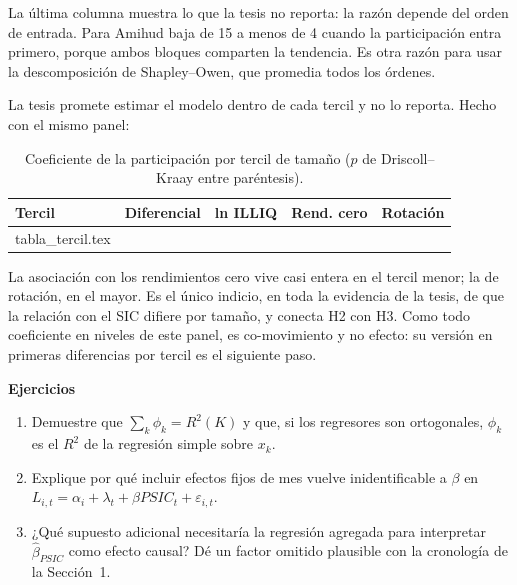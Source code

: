 \documentclass[11pt,letterpaper]{article}
\makeatletter
\newcommand{\tablainput}[1]{\@@input #1.tex }
\theoremstyle{definition}
\theoremstyle{plain}
\newenvironment{ejercicios}{\par\medskip\textbf{Ejercicios}\begin{enumerate}[label=\arabic*.,leftmargin=*]\small}{\end{enumerate}}
\newcommand{\PSIC}{\mathit{PSIC}}
\makeatother
\begin{document}
La última columna muestra lo que la tesis no reporta: la razón depende del orden de entrada. Para Amihud baja de 15 a menos de 4 cuando la participación entra primero, porque ambos bloques comparten la tendencia. Es otra razón para usar la descomposición de Shapley--Owen, que promedia todos los órdenes.

La tesis promete estimar el modelo dentro de cada tercil y no lo reporta. Hecho con el mismo panel:

\begin{table}[h]\centering\small
\caption{Coeficiente de la participación por tercil de tamaño ($p$ de Driscoll--Kraay entre paréntesis).}
\begin{tabular}{@{}lcccc@{}}\toprule
Tercil & Diferencial & ln ILLIQ & Rend. cero & Rotación\\\midrule
\tablainput{tabla_tercil}
\bottomrule\end{tabular}
\end{table}

La asociación con los rendimientos cero vive casi entera en el tercil menor; la de rotación, en el mayor. Es el único indicio, en toda la evidencia de la tesis, de que la relación con el SIC difiere por tamaño, y conecta H2 con H3. Como todo coeficiente en niveles de este panel, es co-movimiento y no efecto: su versión en primeras diferencias por tercil es el siguiente paso.

\begin{ejercicios}
\item Demuestre que $\sum_k\phi_k=R^2(K)$ y que, si los regresores son ortogonales, $\phi_k$ es el $R^2$ de la regresión simple sobre $x_k$.
\item Explique por qué incluir efectos fijos de mes vuelve inidentificable a $\beta$ en $L_{i,t}=\alpha_i+\lambda_t+\beta\PSIC_t+\varepsilon_{i,t}$.
\item ¿Qué supuesto adicional necesitaría la regresión agregada para interpretar $\hat\beta_{\PSIC}$ como efecto causal? Dé un factor omitido plausible con la cronología de la Sección~1.
\end{ejercicios}

\end{document}
